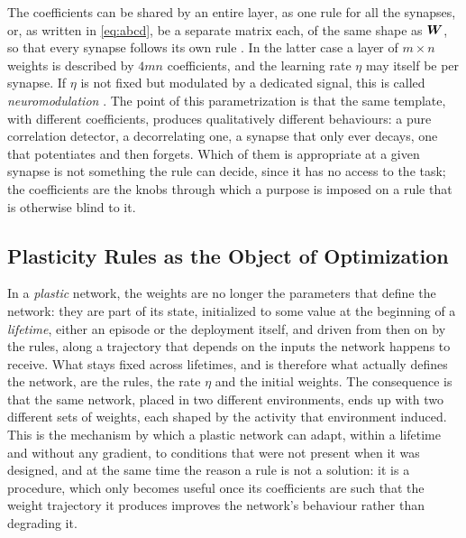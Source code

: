  The coefficients can be shared by an entire layer, as one rule for all the synapses, or, as written in \eqref{eq:abcd}, be a separate matrix each, of the same shape as $\bm{W}$, so that every synapse follows its own rule \cite{niv2002evolution, najarro2020meta}. In the latter case a layer of $m \times n$ weights is described by $4mn$ coefficients, and the learning rate $\eta$ may itself be per synapse. If $\eta$ is not fixed but modulated by a dedicated signal, this is called \emph{neuromodulation} \cite{soltoggio2008evolutionary}. The point of this parametrization is that the same template, with different coefficients, produces qualitatively different behaviours: a pure correlation detector, a decorrelating one, a synapse that only ever decays, one that potentiates and then forgets. Which of them is appropriate at a given synapse is not something the rule can decide, since it has no access to the task; the coefficients are the knobs through which a purpose is imposed on a rule that is otherwise blind to it.

\subsection{Plasticity Rules as the Object of Optimization}
\label{subsec:evolved-plasticity}

In a \emph{plastic} network, the weights are no longer the parameters that define the network: they are part of its state, initialized to some value at the beginning of a \emph{lifetime}, either an episode or the deployment itself, and driven from then on by the rules, along a trajectory that depends on the inputs the network happens to receive. What stays fixed across lifetimes, and is therefore what actually defines the network, are the rules, the rate $\eta$ and the initial weights. The consequence is that the same network, placed in two different environments, ends up with two different sets of weights, each shaped by the activity that environment induced. This is the mechanism by which a plastic network can adapt, within a lifetime and without any gradient, to conditions that were not present when it was designed, and at the same time the reason a rule is not a solution: it is a procedure, which only becomes useful once its coefficients are such that the weight trajectory it produces improves the network's behaviour rather than degrading it.

